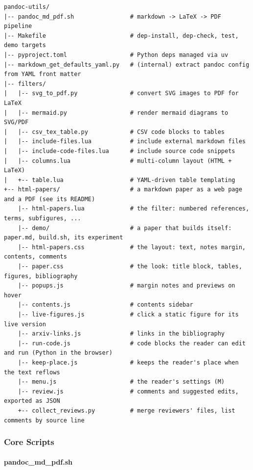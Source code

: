 \documentclass[
]{article}
\begin{document}
\begin{verbatim}
pandoc-utils/
|-- pandoc_md_pdf.sh                # markdown -> LaTeX -> PDF pipeline
|-- Makefile                        # dep-install, dep-check, test, demo targets
|-- pyproject.toml                  # Python deps managed via uv
|-- markdown_get_defaults_yaml.py   # (internal) extract pandoc config from YAML front matter
|-- filters/
|   |-- svg_to_pdf.py               # convert SVG images to PDF for LaTeX
|   |-- mermaid.py                  # render mermaid diagrams to SVG/PDF
|   |-- csv_tex_table.py            # CSV code blocks to tables
|   |-- include-files.lua           # include external markdown files
|   |-- include-code-files.lua      # include source code snippets
|   |-- columns.lua                 # multi-column layout (HTML + LaTeX)
|   +-- table.lua                   # YAML-driven table templating
+-- html-papers/                    # a markdown paper as a web page and a PDF (see its README)
    |-- html-papers.lua             # the filter: numbered references, terms, subfigures, ...
    |-- demo/                       # a paper that builds itself: paper.md, build.sh, its experiment
    |-- html-papers.css             # the layout: text, notes margin, contents, comments
    |-- paper.css                   # the look: title block, tables, figures, bibliography
    |-- popups.js                   # margin notes and previews on hover
    |-- contents.js                 # contents sidebar
    |-- live-figures.js             # click a static figure for its live version
    |-- arxiv-links.js              # links in the bibliography
    |-- run-code.js                 # code blocks the reader can edit and run (Python in the browser)
    |-- keep-place.js               # keeps the reader's place when the text reflows
    |-- menu.js                     # the reader's settings (M)
    |-- review.js                   # comments and suggested edits, exported as JSON
    +-- collect_reviews.py          # merge reviewers' files, list comments by source line
\end{verbatim}

\subsubsection{Core Scripts}\label{core-scripts}

\paragraph{pandoc\_md\_pdf.sh}\label{pandoc_md_pdf.sh}
\end{document}
